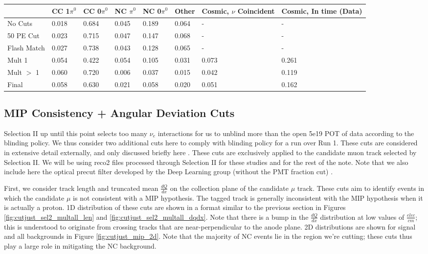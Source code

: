 \documentclass{article}
\begin{document}
\begin{table*}
\centering
{}
 \begin{tabular}{| l | l | l |l|l|l|l|l|}
 \hline
 & CC 1$\pi^0$ & CC 0$\pi^0$ & NC $\pi^0$ & NC 0$\pi^0$ & Other & Cosmic, $\nu$ Coincident & Cosmic, In time (Data) \\ [0.1ex] \hline
No Cuts & 0.018 & 0.684 & 0.045 & 0.189 & 0.064 & - & -\\ 
50 PE Cut & 0.023 & 0.715 & 0.047 & 0.147 & 0.068 & -& - \\
Flash Match & 0.027 & 0.738 & 0.043 & 0.128 & 0.065 & -&- \\ \hline
Mult 1 & 0.054 & 0.422 & 0.054 & 0.105 & 0.031 & 0.073 & 0.261 \\ 
Mult $>$ 1 & 0.060 & 0.720 & 0.006 & 0.037 & 0.015 & 0.042 & 0.119 \\ 
Final & 0.058 & 0.630 & 0.021 & 0.058 & 0.020 & 0.051 & 0.162 \\ \hline
\end{tabular}
\end{table*}


\clearpage
\subsection{ MIP Consistency + Angular Deviation Cuts}
Selection II up until this point selects too many $\nu_e$ interactions for us to unblind more than the open 5e19 POT of data according to the blinding policy.  We thus consider two additional cuts here to comply with blinding policy for a run over Run 1.  These cuts are considered in extensive detail externally, and only discussed briefly here \cite{bib:jz_unblinding_note}.  These cuts are exclusively applied to the candidate muon track selected by Selection II.  We will be using reco2 files processed through Selection II for these studies and for the rest of the note.  Note that we also include here the optical precut filter developed by the Deep Learning group (without the PMT fraction cut) \cite{bib:jarrett_opticalprecut}.
\par First, we consider track length and truncated mean $\frac{dQ}{dx}$ on the collection plane of the candidate $\mu$ track. These cuts aim to identify events in which the candidate $\mu$ is not consistent with a MIP hypothesis. The tagged track is generally inconsistent with the MIP hypothesis when it is actually a proton. 1D distribution of these cuts are shown in a format similar to the previous section in Figures \ref{fig:cutjust_sel2_multall_len} and \ref{fig:cutjust_sel2_multall_dqdx}. Note that there is a bump in the $\frac{dQ}{dx}$ distribution at low values of $\frac{elec}{cm}$; this is understood to originate from crossing tracks that are near-perpendicular to the anode plane.  2D distributions are shown for signal and all backgrounds in Figure \ref{fig:cutjust_mip_2d}.  Note that the majority of NC events lie in the region we're cutting; these cuts thus play a large role in mitigating the NC background.
\end{document}
